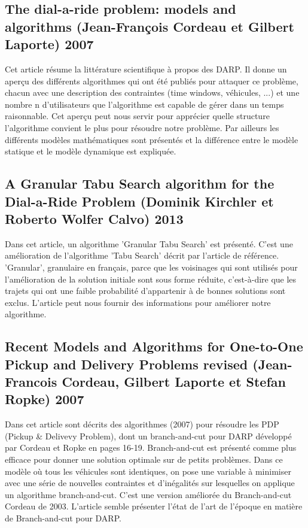 \documentclass[10pt,a4paper]{report}
\begin{document}
\subsection*{The dial-a-ride problem: models and algorithms (Jean-François Cordeau et Gilbert Laporte) 2007}
Cet article résume la littérature scientifique à propos des DARP. Il donne un aperçu des différents algorithmes qui ont été publiés pour attaquer ce problème, chacun avec une description des contraintes (time windows, véhicules, ...) et une nombre n d'utilisateurs que l'algorithme est capable de gérer dans un temps raisonnable. Cet aperçu peut nous servir pour apprécier quelle structure l'algorithme convient le plus pour résoudre notre problème. Par ailleurs les différents modèles mathématiques sont présentés et la différence entre le modèle statique et le modèle dynamique est expliquée.
\subsection*{A Granular Tabu Search algorithm for the Dial-a-Ride Problem (Dominik Kirchler et Roberto Wolfer Calvo) 2013}
Dans cet article, un algorithme 'Granular Tabu Search' est présenté. C'est une amélioration de l'algorithme 'Tabu Search' décrit par l'article de référence. 'Granular', granulaire en français, parce que les voisinages qui sont utilisés pour l'amélioration de la solution initiale sont sous forme réduite, c'est-à-dire que les trajets qui ont une faible probabilité d'appartenir à de bonnes solutions sont exclus. L'article peut nous fournir des informations pour améliorer notre algorithme.
\subsection*{Recent Models and Algorithms for One-to-One Pickup and Delivery Problems revised (Jean-Francois Cordeau, Gilbert Laporte et Stefan Ropke) 2007}
Dans cet article sont décrits des algorithmes (2007) pour résoudre les PDP (Pickup \& Delivevy Problem), dont un branch-and-cut pour DARP développé par Cordeau et Ropke en pages 16-19. Branch-and-cut est présenté comme plus efficace pour donner une solution optimale sur de petits problèmes. 
Dans ce modèle où tous les véhicules sont identiques, on pose une variable à minimiser avec une série de nouvelles contraintes et d'inégalités sur lesquelles on applique un algorithme branch-and-cut. C'est une version améliorée du Branch-and-cut Cordeau de 2003. 
L'article semble présenter l'état de l'art de l'époque en matière de Branch-and-cut pour DARP.
\end{document}
